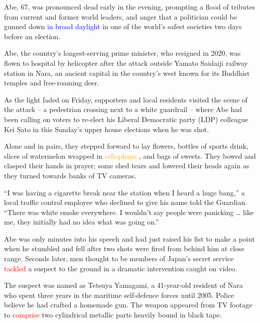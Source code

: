 \documentclass[12pt,a4paper]{article}
\begin{document}
    \par Abe, 67, was pronounced dead early in the evening, prompting a flood of tributes from current and former world leaders, and anger that a politician could be gunned down \textcolor{blue}{in broad daylight}\cite{in_broad_daylight} in one of the world’s safest societies two days before an election.

    \par Abe, the country’s longest-serving prime minister, who resigned in 2020, was flown to hospital by helicopter after the attack outside Yamato Saidaiji railway station in Nara, an ancient capital in the country’s west known for its Buddhist temples and free-roaming deer.

    \par As the light faded on Friday, supporters and local residents visited the scene of the attack – a pedestrian crossing next to a white guardrail – where Abe had been calling on voters to re-elect his Liberal Democratic party (LDP) colleague Kei Sato in this Sunday’s upper house elections when he was shot.



    \par Alone and in pairs, they stepped forward to lay flowers, bottles of sports drink, slices of watermelon wrapped in \textcolor{orange}{cellophane} \cite{cellophane}, and bags of sweets. They bowed and clasped their hands in prayer; some shed tears and lowered their heads again as they turned towards banks of TV cameras.

    \par “I was having a cigarette break near the station when I heard a huge bang,” a local traffic control employee who declined to give his name told the Guardian. “There was white smoke everywhere. I wouldn’t say people were panicking … like me, they initially had no idea what was going on.”
    
    \par Abe was only minutes into his speech and had just raised his fist to make a point when he stumbled and fell after two shots were fired from behind him at close range. Seconds later, men thought to be members of Japan’s secret service \textcolor{red}{tackled}\cite{tackled} a suspect to the ground in a dramatic intervention caught on video.





    \par The suspect was named as Tetsuya Yamagami, a 41-year-old resident of Nara who spent three years in the maritime self-defence forces until 2005. Police believe he had crafted a homemade gun. The weapon appeared from TV footage to \textcolor{red}{comprise}\cite{comprise} two cylindrical metallic parts heavily bound in black tape.
\end{document}
